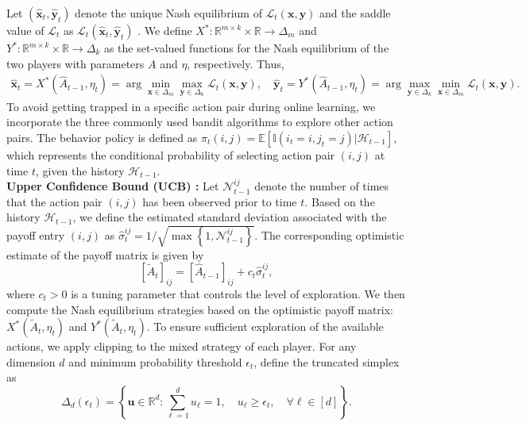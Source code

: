 \documentclass[12pt]{article}
\begin{document}
Let $(\widehat{\bm{x}}_t,\widehat{\bm{y}}_t)$ denote the unique Nash equilibrium of $\mathcal{L}_t(\bm{x},\bm{y})$ and the saddle value of $\mathcal{L}_t$ as $\mathcal{L}_t(\widehat{\bm{x}}_t,\widehat{\bm{y}}_t)$ \citep{milgrom2002envelope}. 
We define $X^\ast:\mathbb{R}^{m \times k} \times \mathbb{R} \rightarrow \Delta_m$ and $Y^\ast:\mathbb{R}^{m \times k} \times \mathbb{R} \rightarrow \Delta_k$ as the set-valued functions for the Nash equilibrium of the two players with parameters $A$ and $\eta$, respectively. Thus,
\begin{equation}
\begin{aligned}
    \widehat{\bm{x}}_t
     =
    X^\ast(\widehat{A}_{t-1},\eta_t)
    =
    \arg\min_{\bm{x} \in \Delta_m}
    \max_{\bm{y} \in \Delta_k}
    \mathcal{L}_t(\bm{x},\bm{y}), \quad
    \widehat{\bm{y}}_t
    =
    Y^\ast(\widehat{A}_{t-1},\eta_t)
    =
    \arg\max_{\bm{y} \in \Delta_k}
    \min_{\bm{x} \in \Delta_m}
    \mathcal{L}_t(\bm{x},\bm{y}).
\end{aligned}
\end{equation}
To avoid getting trapped in a specific action pair during online learning, we incorporate the three commonly used bandit algorithms to explore other action pairs. The behavior policy is defined as ${\pi_t(i,j)}= \mathbb{E}[\mathbb{I}(i_t=i,j_t=j) \vert \mathcal{H}_{t-1}]$, which represents the conditional probability of selecting action pair $(i,j)$ at time $t$, given the history $\mathcal{H}_{t-1}$. \\
\textbf{Upper Confidence Bound (UCB) \citep{li2011unbiased}:} 
Let $\mathcal{N}_{t-1}^{ij}$ denote the number of times that the action pair 
$(i,j)$ has been observed prior to time $t$. Based on the history 
$\mathcal{H}_{t-1}$, we define the estimated standard deviation associated 
with the payoff entry $(i,j)$ as $\widehat{\sigma}_{t}^{ij}=1/\sqrt{\max\left\{1,\mathcal{N}_{t-1}^{ij}\right\}}$.
The corresponding optimistic estimate of the payoff matrix is given by
\[
[\widetilde{A}_{t}]_{ij} = [\widehat{A}_{t-1}]_{ij} + c_t\widehat{\sigma}_{t}^{ij},
\]
where $c_t>0$ is a tuning parameter that controls the level of exploration. We then compute the Nash equilibrium strategies based on the  optimistic payoff matrix: $X^\ast(\widetilde{A}_{t},\eta_t)$ and $Y^\ast(\widetilde{A}_{t},\eta_t)$.
To ensure sufficient exploration of the available actions, we apply clipping to the mixed strategy of each player. For any dimension $d$ and minimum probability threshold $\epsilon_t$, define the truncated simplex as
\[
    \Delta_d(\epsilon_t) =
    \left\{
        \bm{u}\in\mathbb{R}^d:
        \sum_{\ell=1}^{d} u_\ell = 1,
        \quad
        u_\ell \geq \epsilon_t,
        \quad
        \forall \ell\in[d]
    \right\}.
\]
\end{document}
